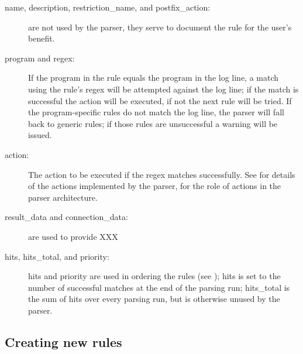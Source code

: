 \begin{description}

    \item [name, description, restriction\_name, and postfix\_action:] are
        not \newline{} used by the parser, they serve to document the rule
        for the user's benefit.

    \item [program and regex:] If the program in the rule equals the
        program in the log line, a match using the rule's regex will be
        attempted against the log line; if the match is successful the
        action will be executed, if not the next rule will be tried.  If
        the program-specific rules do not match the log line, the parser
        will fall back to generic rules; if those rules are unsuccessful a
        warning will be issued.

    \item [action:] The action to be executed if the regex matches
        successfully.  See  for details of
        the actions implemented by the parser,  for the role of actions in the parser architecture.

    \item [result\_data and connection\_data:] are used to provide XXX

    \item [hits, hits\_total, and priority:] hits and priority are used in
        ordering the rules (see );
        hits is set to the number of successful matches at the end of the
        parsing run; hits\_total is the sum of hits over every parsing run,
        but is otherwise unused by the parser.


\end{description}


\subsection{Creating new rules}

\label{creating new rules}

